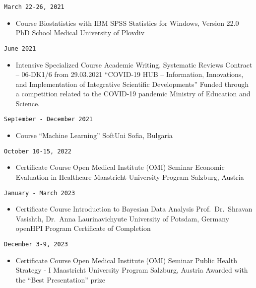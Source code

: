\documentclass[
  12pt,
  letterpaper,
  DIV=11,
  numbers=noendperiod]{scrartcl}
\providecommand{\tightlist}{%
  \setlength{\itemsep}{0pt}\setlength{\parskip}{0pt}}\usepackage{longtable,booktabs,array}
\begin{document}
\texttt{March\ 22-26,\ 2021}

\begin{itemize}
\tightlist
\item
  Course \textbar{} Biostatistics with IBM SPSS Statistics for Windows,
  Version 22.0 \textbar{} PhD School \textbar{} Medical University of
  Plovdiv
\end{itemize}

\texttt{June\ 2021}

\begin{itemize}
\tightlist
\item
  Intensive Specialized Course \textbar{} Academic Writing, Systematic
  Reviews \textbar{} Contract -- 06-DK1/6 from 29.03.2021 \textbar{}
  ``COVID-19 HUB -- Information, Innovations, and Implementation of
  Integrative Scientific Developments'' \textbar{} Funded through a
  competition related to the COVID-19 pandemic \textbar{} Ministry of
  Education and Science.
\end{itemize}

\texttt{September\ -\ December\ 2021}

\begin{itemize}
\tightlist
\item
  Course ``Machine Learning'' \textbar{} SoftUni \textbar{} Sofia,
  Bulgaria
\end{itemize}

\texttt{October\ 10-15,\ 2022}

\begin{itemize}
\tightlist
\item
  Certificate Course \textbar{} Open Medical Institute (OMI) Seminar
  \textbar{} Economic Evaluation in Healthcare \textbar{} Maastricht
  University Program \textbar{} Salzburg, Austria
\end{itemize}

\texttt{January\ -\ March\ 2023}

\begin{itemize}
\tightlist
\item
  Certificate Course \textbar{} Introduction to Bayesian Data Analysis
  \textbar{} Prof.~Dr.~Shravan Vasishth, Dr.~Anna Laurinavichyute
  \textbar{} University of Potsdam, Germany \textbar{} openHPI Program
  \textbar{} Certificate of Completion
\end{itemize}

\texttt{December\ 3-9,\ 2023}

\begin{itemize}
\tightlist
\item
  Certificate Course \textbar{} Open Medical Institute (OMI) Seminar
  \textbar{} Public Health Strategy - I \textbar{} Maastricht University
  Program \textbar{} Salzburg, Austria \textbar{} Awarded with the
  ``Best Presentation'' prize
\end{itemize}
\end{document}
